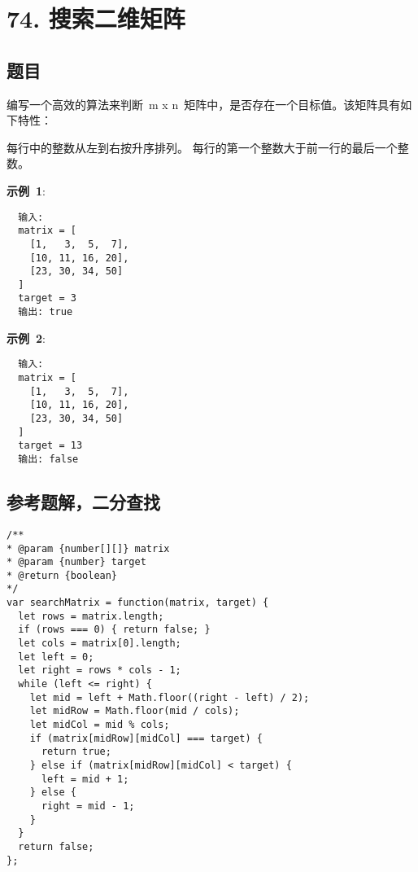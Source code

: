 \newpage
\section{74. 搜索二维矩阵}
\label{leetcode:74}

\subsection{题目}

编写一个高效的算法来判断 m x n 矩阵中，是否存在一个目标值。该矩阵具有如下特性：

每行中的整数从左到右按升序排列。
每行的第一个整数大于前一行的最后一个整数。

\textbf{示例 1}:

\begin{verbatim}
  输入:
  matrix = [
    [1,   3,  5,  7],
    [10, 11, 16, 20],
    [23, 30, 34, 50]
  ]
  target = 3
  输出: true
\end{verbatim}

\textbf{示例 2}:

\begin{verbatim}
  输入:
  matrix = [
    [1,   3,  5,  7],
    [10, 11, 16, 20],
    [23, 30, 34, 50]
  ]
  target = 13
  输出: false
\end{verbatim}

\subsection{参考题解，二分查找}

\begin{verbatim}
/**
* @param {number[][]} matrix
* @param {number} target
* @return {boolean}
*/
var searchMatrix = function(matrix, target) {
  let rows = matrix.length;
  if (rows === 0) { return false; }
  let cols = matrix[0].length;
  let left = 0;
  let right = rows * cols - 1;
  while (left <= right) {
    let mid = left + Math.floor((right - left) / 2);
    let midRow = Math.floor(mid / cols);
    let midCol = mid % cols;
    if (matrix[midRow][midCol] === target) {
      return true;
    } else if (matrix[midRow][midCol] < target) {
      left = mid + 1;
    } else {
      right = mid - 1;
    }
  }
  return false;
};
\end{verbatim}
